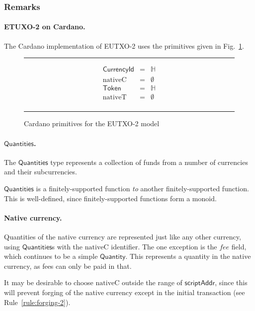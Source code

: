 \documentclass[a4paper]{article}
\newcommand{\s}{\textsf}  %
\newcommand{\msf}[1]{\ensuremath{\mathsf{#1}}}
\newcommand{\mi}[1]{\ensuremath{\mathit{#1}}}
\newcommand\rfskip{7pt}
\newenvironment{ruledfigure}[1]{\begin{figure}[#1]\hrule\vspace{\rfskip}}{\vspace{\rfskip}\hrule\end{figure}}
\newcommand{\scriptAddr}{\msf{scriptAddr}}
\newcommand{\fee}{\mi{fee}}
\newcommand{\qty}{\ensuremath{\s{Quantity}}}
\newcommand{\token}{\ensuremath{\s{Token}}}
\newcommand{\currency}{\ensuremath{\s{CurrencyId}}}
\newcommand{\nativeCur}{\ensuremath{\mathrm{nativeC}}}
\newcommand{\nativeTok}{\ensuremath{\mathrm{nativeT}}}
\newcommand{\qtymap}{\ensuremath{\s{Quantities}}}
\renewcommand\H{\ensuremath{\mathbb{H}}}
\newcommand{\emptyBs}{\ensuremath{\emptyset}}
\begin{document}
\subsubsection{Remarks}
\paragraph{ETUXO-2 on Cardano.}
The Cardano implementation of EUTXO-2 uses the primitives given in
Fig.~\ref{fig:eutxo-2-types-cardano}.
\begin{ruledfigure}{H}
  \begin{displaymath}
    \begin{array}{rll}
      \currency  &=& \H\\
      \nativeCur &=& \emptyBs\\
      \token     &=& \H\\
      \nativeTok &=& \emptyBs\\
    \end{array}
  \end{displaymath}
  \caption{Cardano primitives for the EUTXO-2 model}
  \label{fig:eutxo-2-types-cardano}
\end{ruledfigure}

\paragraph{\qtymap{}. }
The \qtymap{} type represents a collection of funds from a
number of currencies and their subcurrencies.

\qtymap{} is a finitely-supported function \emph{to} another finitely-supported
function. This is well-defined, since finitely-supported functions form a monoid.

\paragraph{Native currency. }
Quantities of the native currency are represented just like any other currency,
using \qtymap{}s with the \nativeCur{} identifier. The one exception is the
\fee{} field, which continues to be a simple \qty{}. This represents a quantity
in the native currency, as fees can only be paid in that.

It may be desirable to choose \nativeCur{} outside the range
of \scriptAddr{}, since this will prevent forging of the native currency
except in the initial transaction (see Rule~\ref{rule:forging-2}).
\end{document}
